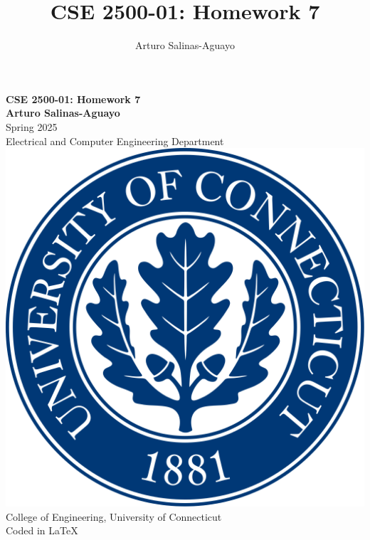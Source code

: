 \documentclass[12pt]{article}
\author{Arturo Salinas-Aguayo}
\title{CSE 2500-01: Homework 7}
\begin{document}
\newcommand{\closure}[2][3]{%
	{}\mkern#1mu\overline{\mkern-#1mu#2}}
\newcommand\ncoverline[1]{\mkern1mu\overline{\mkern-1mu#1\mkern-1mu}\mkern1mu}
\begin{titlepage}
	\centering
	\vspace*{3cm}
	\huge\textbf{CSE 2500-01: Homework 7}\\
	\vspace{5cm}
	\Large\textbf{Arturo Salinas-Aguayo}\\
	\normalsize
	Spring 2025\\
	Electrical and Computer Engineering Department\\
	\vfill
	\includegraphics[scale=0.1]{uconnlogo}\\
	College of Engineering, University of Connecticut\\
	\scriptsize{Coded in \LaTeX}
	\vspace*{1cm}
\end{titlepage}
\end{document}
